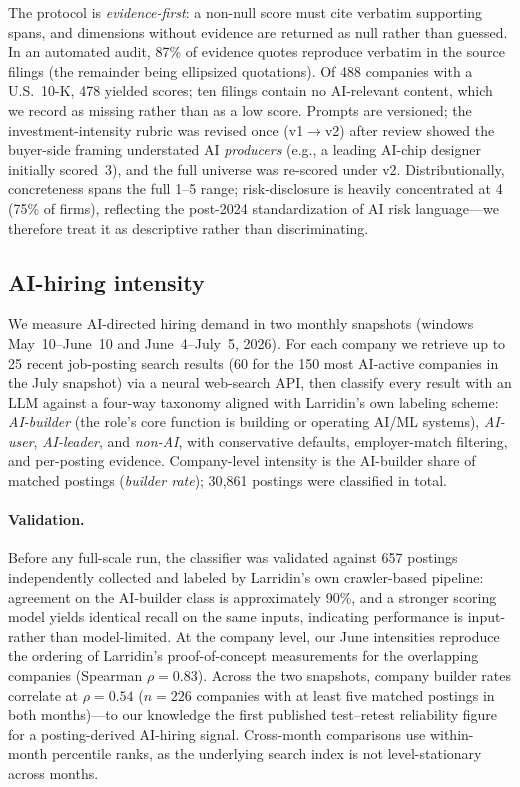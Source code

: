 \documentclass[11pt]{article}
\begin{document}
The protocol is \emph{evidence-first}: a non-null score must cite verbatim
supporting spans, and dimensions without evidence are returned as null rather
than guessed. In an automated audit, 87\% of evidence quotes reproduce verbatim
in the source filings (the remainder being ellipsized quotations). Of 488
companies with a U.S.\ 10-K, 478 yielded scores; ten filings contain no
AI-relevant content, which we record as missing rather than as a low score.
Prompts are versioned; the investment-intensity rubric was revised once
(v1$\to$v2) after review showed the buyer-side framing understated AI
\emph{producers} (e.g., a leading AI-chip designer initially scored~3), and the
full universe was re-scored under v2. Distributionally, concreteness spans the
full 1--5 range; risk-disclosure is heavily concentrated at 4 (75\% of firms),
reflecting the post-2024 standardization of AI risk language---we therefore
treat it as descriptive rather than discriminating.

\subsection{AI-hiring intensity}

We measure AI-directed hiring demand in two monthly snapshots (windows
May~10--June~10 and June~4--July~5, 2026). For each company we retrieve up to
25 recent job-posting search results (60 for the 150 most AI-active companies
in the July snapshot) via a neural web-search API, then classify every result
with an LLM against a four-way taxonomy aligned with Larridin's own labeling
scheme: \emph{AI-builder} (the role's core function is building or operating
AI/ML systems), \emph{AI-user}, \emph{AI-leader}, and \emph{non-AI}, with
conservative defaults, employer-match filtering, and per-posting evidence.
Company-level intensity is the AI-builder share of matched postings
(\emph{builder rate}); 30{,}861 postings were classified in total.

\paragraph{Validation.} Before any full-scale run, the classifier was validated
against 657 postings independently collected and labeled by Larridin's own
crawler-based pipeline: agreement on the AI-builder class is approximately
90\%, and a stronger scoring model yields identical recall on the same inputs,
indicating performance is input- rather than model-limited. At the company
level, our June intensities reproduce the ordering of Larridin's
proof-of-concept measurements for the overlapping companies (Spearman
$\rho=0.83$). Across the two snapshots, company builder rates correlate at
$\rho=0.54$ ($n=226$ companies with at least five matched postings in both
months)---to our knowledge the first published test--retest reliability figure
for a posting-derived AI-hiring signal. Cross-month comparisons use
within-month percentile ranks, as the underlying search index is not
level-stationary across months.
\end{document}
